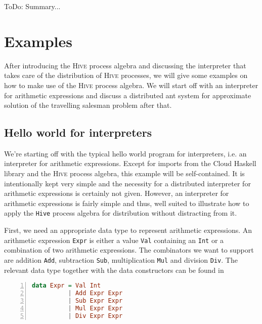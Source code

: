 ToDo: Summary...

\section{Examples}
\label{chp:example}
After introducing the \textsc{Hive} process algebra and discussing the interpreter that takes care of the distribution of \textsc{Hive} processes, we will give some examples on how to make use of the \textsc{Hive} process algebra. We will start off with an interpreter for arithmetic expressions and discuss a distributed ant system for approximate solution of the travelling salesman problem after that.

\subsection{Hello world for interpreters}
We're starting off with the typical hello world program for interpreters, i.e. an interpreter for arithmetic expressions. Except for imports from the \textsf{Cloud Haskell} library and the \textsc{Hive} process algebra, this example will be self-contained. It is intentionally kept very simple and the necessity for a distributed interpreter for arithmetic expressions is certainly not given. However, an interpreter for arithmetic expressions is fairly simple and thus, well suited to illustrate how to apply the \texttt{Hive} process algebra for distribution without distracting from it.

First, we need an appropriate data type to represent arithmetic expressions. An arithmetic expression \texttt{Expr} is either a value \texttt{Val} containing an \texttt{Int} or a combination of two arithmetic expressions. The combinators we want to support are addition \texttt{Add}, subtraction \texttt{Sub}, multiplication \texttt{Mul} and division \texttt{Div}. The relevant data type together with the data constructors can be found in  
\begin{lstlisting}[language=Haskell, caption=Data model for the representation of arithmetic expressions., label=lst:arith_model, numbers=left, frame=bt]
data Expr = Val Int
          | Add Expr Expr
          | Sub Expr Expr
          | Mul Expr Expr
          | Div Expr Expr
\end{lstlisting}

